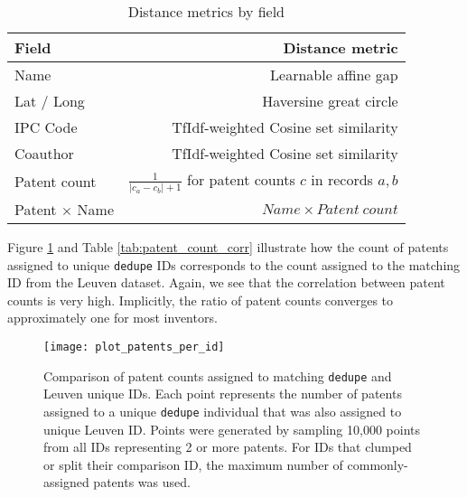 \documentclass[11pt]{article}
\begin{document}
\begin{landscape}

\begin{table}[ht]
  \centering
{\footnotesize
  \begin{tabular}{lr}
    \hline
    Field & Distance metric \\
    \hline
    Name  & Learnable affine gap \\
    Lat / Long & Haversine great circle \\
    IPC Code & TfIdf-weighted Cosine set similarity \\
    Coauthor & TfIdf-weighted Cosine set similarity \\
    Patent count & $\frac{1}{\left|c_a -
      c_b\right| + 1}$ for patent counts $c$ in
    records $a, b$\\
    Patent $\times$ Name & $Name \times Patent~count$ \\
    \hline
  \end{tabular}
}
  \caption{Distance metrics by field}
  \label{tab:dist-metrics}
\end{table}


\end{landscape}

Figure \ref{fig:id-patent-counts} and Table \ref{tab:patent_count_corr}
illustrate how the count of patents assigned to unique \texttt{dedupe}
IDs corresponds to the count assigned to the matching ID from the
Leuven dataset. Again, we see that the correlation between patent
counts is very high. Implicitly, the ratio of patent counts converges
to approximately one for most inventors. 

\begin{figure}[ht]
  \centering
  \texttt{[image: plot\_patents\_per\_id]}
  \caption{Comparison of patent counts assigned to matching
    \texttt{dedupe} and Leuven unique IDs. Each point represents the
    number of patents assigned to a unique \texttt{dedupe} individual
    that was also assigned to unique Leuven ID. Points were generated
    by sampling 10,000 points from all IDs representing 2 or more
    patents. For IDs that clumped
    or split their comparison ID, the maximum number of
    commonly-assigned patents was used.}
  \label{fig:id-patent-counts}
\end{figure}



\end{document}
